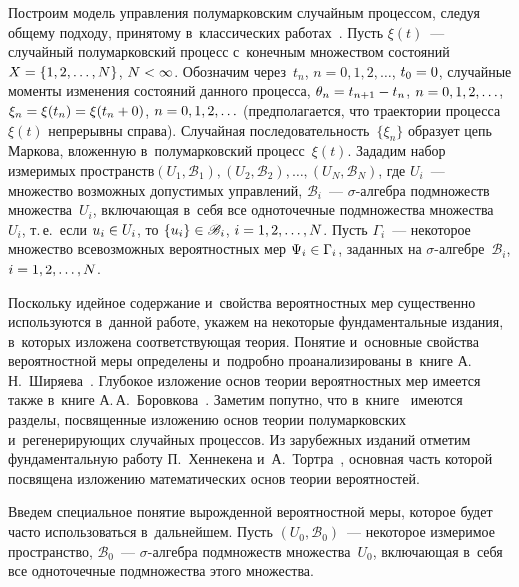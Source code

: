 \begin{multicols}{2}
Построим модель управления полумарковским случайным процессом, следуя общему 
подходу, принятому в~классических работах~\cite{3, 8}. Пусть $\xi(t)$~--- 
случайный полумарковский процесс с~конечным множеством состояний
$X\hm=\{1,2,\ldots, N\}$, $N\hm< \infty$. Обозначим через~$t_n$, $n=0,1,2,\ldots$, 
$t_0\hm=0$, случайные моменты изменения состояний данного процесса, 
$\theta_n\hm=t_{n+1}-t_n$, $n\hm=0,1,2,\ldots$, $\xi_n\hm=\xi(t_n)\hm=\xi(t_n+0)$, 
$n\hm=0,1,2,\ldots$ (предполагается, что траектории процесса~$\xi(t)$ 
непрерывны справа). Случайная последовательность~$\{\xi_n\}$
образует цепь Маркова, вложенную в~полумарковский процесс~$\xi(t)$.
Зададим набор измеримых пространств\linebreak $(U_1, \mathscr{B}_1), 
(U_2, \mathscr{B}_2), \ldots, (U_N, \mathscr{B}_N)$, где $U_i$~--- 
множество возможных допустимых управ\-ле\-ний, $\mathscr{B}_i$~--- $\sigma$-ал\-геб\-ра 
подмножеств множества~$U_i$, вклю\-ча\-ющая в~себя все одноточечные подмножества\linebreak  
множества~$U_i$, т.\,е.\ если $u_i \hm\in U_i$, то $\{u_i\} \hm\in \mathscr{B}_i$, 
$i\hm=1,2,\ldots, N$.
Пусть $\Gamma_i$~--- некоторое множество всевозможных вероятностных мер $\Psi_i 
\hm \in \Gamma_i$, заданных на $\sigma$-ал\-геб\-ре~$\mathscr{B}_i$, $i\hm=1,2,\ldots,N$.

Поскольку идейное содержание и~свойства вероятностных мер существенно используются 
в~данной работе, укажем на некоторые фундаментальные издания, в~которых 
изложена соответствующая тео\-рия. Понятие и~основные свойства вероятностной 
меры определены и~подробно проанализированы в~книге А.\,Н.~Ширяева~\cite[гл.~II]{15}. 
Глубокое изложение основ теории вероятностных мер имеется также в~книге 
А.\,А.~Боровкова~\cite{16}. Заметим попутно, что в~книге~\cite{16} имеются разделы, 
посвященные изложению основ теории полумарковских и~регенерирующих случайных процессов. 
Из зарубежных изданий отметим фундаментальную работу П.~Хеннекена и~А.~Тортра~\cite{17}, 
основная часть которой посвящена изложению математических основ теории вероятностей.

Введем специальное понятие вырожденной вероятностной меры, которое будет часто 
использоваться в~дальнейшем. Пусть $(U_0, \mathscr{B}_0)$~--- некоторое измеримое 
пространство, $\mathscr{B}_0$~--- $\sigma$-ал\-геб\-ра подмножеств множества~$U_0$, 
включающая в~себя все одноточечные подмножества этого множества.

\medskip


\end{multicols}
